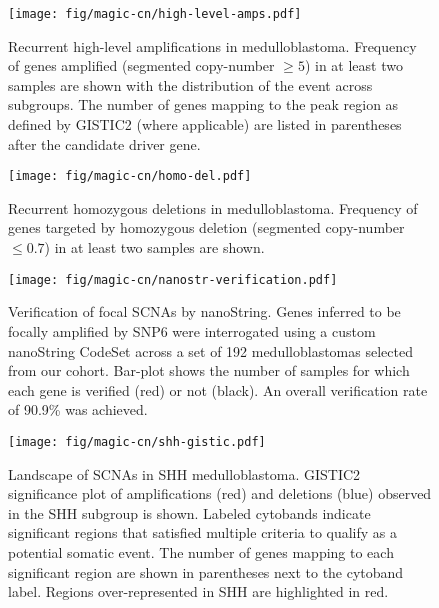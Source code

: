 \documentclass[11pt,letterpaper]{article}
\theoremstyle{definition}
\begin{document}
\begin{SCfigure}
	\centering
	\texttt{[image: fig/magic-cn/high-level-amps.pdf]}
	\caption[Recurrent high-level amplifications in medulloblastoma]
	{
	Recurrent high-level amplifications in medulloblastoma.
	Frequency of genes amplified (segmented copy-number $\geq 5$) in at least two samples are shown with the distribution of the event across subgroups. The number of genes mapping to the peak region as defined by GISTIC2 (where applicable) are listed in parentheses after the candidate driver gene.
	}
	\label{fig:high-level-amps}
\end{SCfigure}

\begin{SCfigure}
	\centering
	\texttt{[image: fig/magic-cn/homo-del.pdf]}
	\caption[Recurrent homozygous deletions in medulloblastoma]
	{
	Recurrent homozygous deletions in medulloblastoma.
	Frequency of genes targeted by homozygous deletion (segmented copy-number $\leq 0.7$) in at least two samples are shown.
	}
	\label{fig:homo-del}
\end{SCfigure}

\begin{SCfigure}
	\centering
	\texttt{[image: fig/magic-cn/nanostr-verification.pdf]}
	\caption[Verification of focal SCNAs by nanoString]
	{
	Verification of focal SCNAs by nanoString.
	Genes inferred to be focally amplified by SNP6 were interrogated using a custom nanoString CodeSet across a set of 192 medulloblastomas selected from our cohort. Bar-plot shows the number of samples for which each gene is verified (red) or not (black). An overall verification rate of 90.9\% was achieved.
	}
	\label{fig:nanostr-verification}
\end{SCfigure}

\clearpage

\begin{figure}[h]
	\begin{center}
		\texttt{[image: fig/magic-cn/shh-gistic.pdf]}
	\end{center}
	\caption[Landscape of SCNAs in SHH medulloblastoma]
	{
	Landscape of SCNAs in SHH medulloblastoma.
	GISTIC2 significance plot of amplifications (red) and deletions (blue) observed in the SHH subgroup is shown.
	Labeled cytobands indicate significant regions that satisfied multiple criteria to qualify as a potential somatic event. The number of genes mapping to each significant region are shown in parentheses next to the cytoband label.  Regions over-represented in SHH are highlighted in red.
	}
	\label{fig:shh-gistic}
\end{figure}
\end{document}
